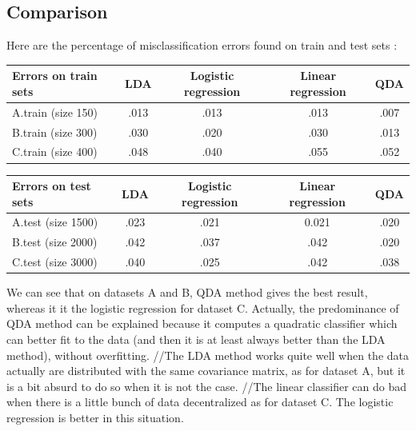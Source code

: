 \documentclass[11pt,a4paper]{article}
\begin{document}
\subsection{Comparison}
%
\hspace*{-6mm}Here are the percentage of misclassification errors found on train and test sets :
\\[5mm]
\begin{tabular}{|l|c|c|c|c|}
  \hline
  Errors on train sets & LDA & Logistic regression & Linear regression & QDA \\
  \hline
  A.train (size 150) & .013 & .013 & .013 & .007 \\
  B.train (size 300) & .030 & .020 & .030 & .013 \\
  C.train (size 400) & .048 & .040 & .055 & .052 \\
  \hline
\end{tabular}
%
\begin{tabular}{|l|c|c|c|c|}
  \hline
  Errors on test sets & LDA & Logistic regression & Linear regression & QDA \\
  \hline
  A.test (size 1500) & .023 & .021 & 0.021 & .020 \\
  B.test (size 2000) & .042 & .037 & .042 & .020 \\
  C.test (size 3000) & .040 & .025 & .042 & .038 \\
  \hline
\end{tabular}

We can see that on datasets A and B, QDA method gives the best result, whereas it it the logistic regression for dataset C. Actually, the predominance of QDA method can be explained because it computes a quadratic classifier which can better fit to the data (and then it is at least always better than the LDA method), without overfitting.
//The LDA method works quite well when the data actually are distributed with the same covariance matrix, as for dataset A, but it is a bit absurd to do so when it is not the case.
//The linear classifier can do bad when there is a little bunch of data decentralized as for dataset C. The logistic regression is better in this situation.
\end{document}
